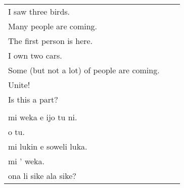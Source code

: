 \begin{supertabular}{p{5,5cm}|ll}
I saw three birds.  &&   \\ %
Many people are coming. &&  \\   %
The first person is here. && \\   %
I own two cars.  &&  \\ %
Some (but not a lot) of people are coming. && \\  %
Unite!  &&   \\ %
Is this a part? &&  \\ %
 && \\ %
mi weka e ijo tu ni. &&   \\ %
o tu.  &&  \\ %
mi lukin e soweli luka. && \\   %
mi ' weka.  &&  \\ %
ona li sike ala sike? && \\ %
\end{supertabular}
